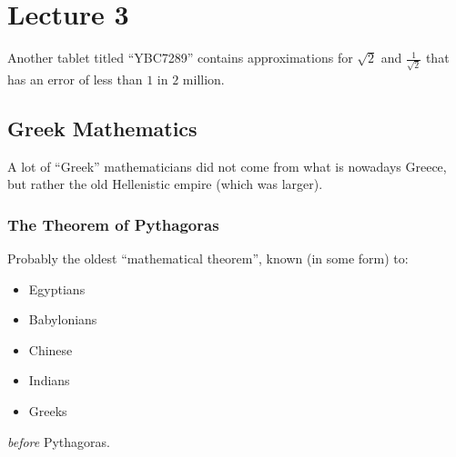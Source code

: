 \documentclass[class=article, crop=false]{standalone}
\begin{document}
  \section{Lecture 3}
  Another tablet titled ``YBC7289'' contains approximations for $\sqrt{2}$ and $\frac{1}{\sqrt{2}}$ that has an error of less than $1$ in $2$ million.
  \subsection{Greek Mathematics}
  \begin{note}{}
    A lot of ``Greek'' mathematicians did not come from what is nowadays Greece, but rather the old Hellenistic empire (which was larger).
  \end{note}
  \subsubsection{The Theorem of Pythagoras}
  Probably the oldest ``mathematical theorem'', known (in some form) to:
  \begin{itemize}
    \item Egyptians
    \item Babylonians
    \item Chinese
    \item Indians
    \item Greeks
  \end{itemize}
  \emph{before} Pythagoras.
\end{document}
